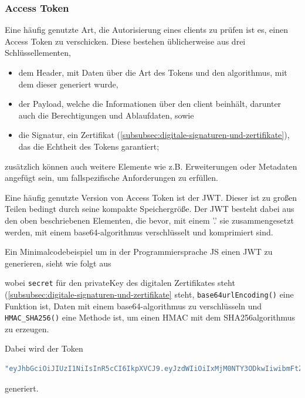 \subsubsection[Token-Verfahren]{Access Token}\label{subsubsec:access-token}
Eine häufig genutzte Art, die Autorisierung eines \glspl{client} zu prüfen ist es, einen Access Token zu verschicken.
Diese bestehen üblicherweise aus drei Schlüssellementen, 
\begin{itemize}
    \item dem Header, mit Daten über die Art des Tokens und den \gls{algorithmus}, mit dem dieser generiert wurde,
    \item der Payload, welche die Informationen über den \gls{client} beinhält, darunter auch die Berechtigungen und Ablaufdaten, sowie 
    \item die Signatur, ein Zertifikat (\autoref{subsubsec:digitale-signaturen-und-zertifikate}), das die Echtheit des Tokens garantiert;
\end{itemize}\label{itm:TokenElemente}
zusätzlich können auch weitere Elemente wie z.B. Erweiterungen oder Metadaten angefügt sein, um fallspezifische Anforderungen zu erfüllen.\autocite[\vglf][]{AccessTo39:online}

Eine häufig genutzte Version von Access Token ist der \ac{JWT}. Dieser ist zu großen Teilen bedingt durch seine kompakte Speichergröße.\autocite[\vglf][]{rfc7519} Der \ac{JWT} besteht dabei aus den oben beschriebenen Elementen, die bevor, mit einem '.'  sie zusammengesetzt werden, mit einem \gls{base64}-\gls{algorithmus} verschlüsselt und komprimiert sind.\autocite[\vglf][]{rfc7519}

Ein Minimalcodebeispiel um in der Programmiersprache \ac{JS} einen \ac{JWT} zu generieren, sieht wie folgt aus

\label{listing:JWT}

wobei \lstinline!secret! für den \gls{privateKey} des digitalen Zertifikates steht (\autoref{subsubsec:digitale-signaturen-und-zertifikate} steht, \lstinline!base64urlEncoding()! eine Funktion ist, Daten mit einem \gls{base64}-\gls{algorithmus} zu verschlüsseln und \lstinline!HMAC_SHA256()! eine Methode ist, um einen \ac{HMAC} mit dem \gls{SHA256}\nonbreakdash\gls{algorithmus} zu erzeugen.

Dabei wird der Token
\begin{lstlisting}[language = JavaScript]
"eyJhbGciOiJIUzI1NiIsInR5cCI6IkpXVCJ9.eyJzdWIiOiIxMjM0NTY3ODkwIiwibmFtZSI6IkpvaG4gRG9lIiwiaWF0IjoxNTE2MjM5MDIyfQ.SflKxwRJSMeKKF2QT4fwpMeJf36POk6yJV_adQssw5c"
\end{lstlisting}
generiert.

